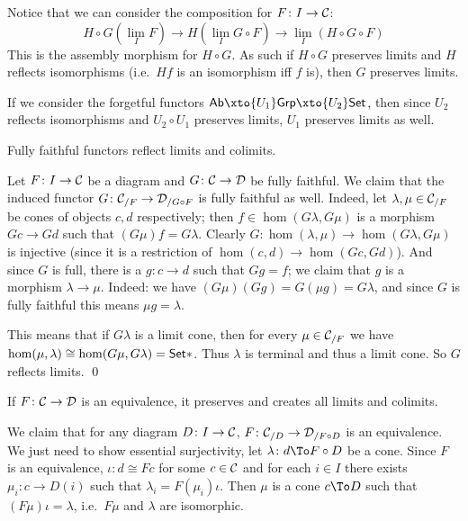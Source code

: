 \elemm

Notice that we can consider the composition for $F\colon I\to{{\cal C}}$:
$$ H\circ G(\lim_IF) \to H(\lim_IG\circ F) \to \lim_I(H\circ G\circ F) $$
This is the assembly morphism for $H\circ G$.
As such if $H\circ G$ preserves limits and $H$ reflects isomorphisms (i.e.\ $Hf$ is an isomorphism iff $f$ is), then $G$ preserves limits.

\bexam

    If we consider the forgetful functors $\ab\xto{U_1}\grp\xto{U_2}\Set$, then since $U_2$ reflects isomorphisms and $U_2\circ U_1$ preserves limits, $U_1$ preserves limits as well.

\eexam

\bprop

    Fully faithful functors reflect limits and colimits.

\eprop

\bproof

    Let $F\colon I\to{{\cal C}}$ be a diagram and $G\colon{{\cal C}}\to{{\cal D}}$ be fully faithful.
    We claim that the induced functor $G\colon{{\cal C}}_{/F}\to{{\cal D}}_{/G\circ F}$ is fully faithful as well.
    Indeed, let $\lambda,\mu\in{{\cal C}}_{/F}$ be cones of objects $c,d$ respectively; then $f\in\hom(G\lambda,G\mu)$ is a morphism $Gc\to Gd$ such that $(G\mu)f=G\lambda$.
    Clearly $G\colon\hom(\lambda,\mu)\to\hom(G\lambda,G\mu)$ is injective (since it is a restriction of $\hom(c,d)\to\hom(Gc,Gd)$).
    And since $G$ is full, there is a $g\colon c\to d$ such that $Gg=f$; we claim that $g$ is a morphism $\lambda\to\mu$.
    Indeed: we have $(G\mu)(Gg)=G(\mu g)=G\lambda$, and since $G$ is fully faithful this means $\mu g=\lambda$.

    This means that if $G\lambda$ is a limit cone, then for every $\mu\in{{\cal C}}_{/F}$ we have $\hom(\mu,\lambda)\cong\hom(G\mu,G\lambda)={\sf Set}*$.
    Thus $\lambda$ is terminal and thus a limit cone.
    So $G$ reflects limits.
    \qed

\eproof

\bcoro

    If $F\colon{{\cal C}}\to{{\cal D}}$ is an equivalence, it preserves and creates all limits and colimits.

\ecoro

\bproof

    We claim that for any diagram $D\colon I\to{{\cal C}}$, $F\colon{{\cal C}}_{/D}\to{{\cal D}}_{/F\circ D}$ is an equivalence.
    We just need to show essential surjectivity, let $\lambda\colon d\To F\circ D$ be a cone.
    Since $F$ is an equivalence, $\iota\colon d\cong Fc$ for some $c\in{{\cal C}}$ and for each $i\in I$ there exists $\mu_i\colon c\to D(i)$ such that $\lambda_i=F(\mu_i)\iota$.
    Then $\mu$ is a cone $c\To D$ such that $(F\mu)\iota=\lambda$, i.e.\ $F\mu$ and $\lambda$ are isomorphic.

